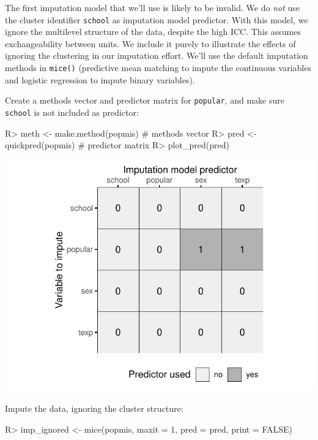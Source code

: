 \documentclass[
]{jss}
\begin{document}
The first imputation model that we'll use is likely to be invalid. We do
\emph{not} use the cluster identifier \texttt{school} as imputation
model predictor. With this model, we ignore the multilevel structure of
the data, despite the high ICC. This assumes exchangeability between
units. We include it purely to illustrate the effects of ignoring the
clustering in our imputation effort. We'll use the default imputation
methods in \texttt{mice()} (predictive mean matching to impute the
continuous variables and logistic regression to impute binary
variables).

Create a methods vector and predictor matrix for \texttt{popular}, and
make sure \texttt{school} is not included as predictor:

\begin{CodeChunk}
\begin{CodeInput}
R> meth <- make.method(popmis) # methods vector
R> pred <- quickpred(popmis)   # predictor matrix
R> plot_pred(pred)
\end{CodeInput}


\begin{center}\includegraphics{Imputation_of_Incomplete_Multilevel_Data_files/figure-latex/pop-ignored-pred-1} \end{center}

\end{CodeChunk}

Impute the data, ignoring the cluster structure:

\begin{CodeChunk}
\begin{CodeInput}
R> imp_ignored <- mice(popmis, maxit = 1, pred = pred, print = FALSE)
\end{CodeInput}
\end{CodeChunk}
\end{document}
